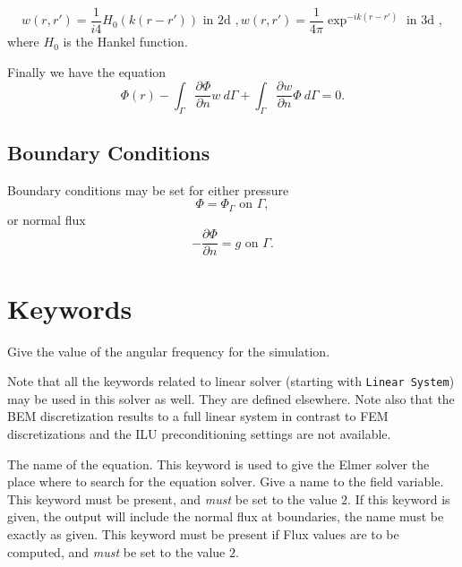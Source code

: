 \begin{versiona}
\begin{equation}
 w(r,r') = \frac{1}{i4}H_0(k(r-r')) \mbox{ in 2d }, 
 w(r,r') = \frac{1}{4\pi}\exp^{-ik(r-r')} \mbox{ in 3d },
\end{equation}
where $H_0$ is the Hankel function.

Finally we have the equation
\begin{equation}
\Phi(r) -
\int_\Gamma \frac{\partial\Phi}{\partial n} w\ d\Gamma +
\int_\Gamma \frac{\partial w}{\partial n} \Phi\ d\Gamma = 0.
\end{equation}

\subsection{Boundary Conditions}

Boundary conditions may be set for either pressure
\begin{equation}
\Phi = \Phi_\Gamma \mbox{ on } \Gamma,
\end{equation}
or normal flux
\begin{equation}
-\frac{\partial \Phi}{\partial n} = g \mbox{ on } \Gamma.
\end{equation}


\section{Keywords} 
\end{versiona}

\sifbegin

\sifbegin
{}
Give the value of the angular frequency for the simulation.
\sifend

Note that all the keywords related to linear solver (starting with {\tt Linear System})
may be used in this solver as well.
They are defined elsewhere.  Note also that the BEM discretization
results to a full linear system in contrast to FEM discretizations
and the ILU preconditioning settings are not available.

\sifbegin
{} 
The name of the equation.
This keyword is used to give the Elmer solver the place where
to search for the  equation solver.
Give a name to the field variable.
This keyword must be present, and {\it must} be set to the value $2$.
If this keyword is given, the output will include the normal flux at
boundaries, the name must be exactly as given.
This keyword must be present if Flux values are to be computed,
and {\it must} be set to the value $2$.
\sifend

